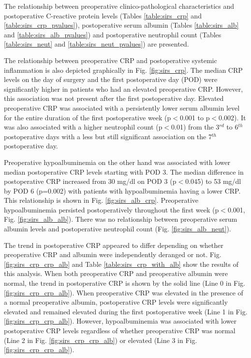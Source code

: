 The relationship between preoperative clinico-pathological characteristics and postoperative C-reactive protein levels (Tables \ref{table:sirs_crp} and \ref{table:sirs_crp_pvalues}), postoperative serum albumin (Tables \ref{table:sirs_alb} and \ref{table:sirs_alb_pvalues}) and postoperative neutrophil count (Tables \ref{table:sirs_neut} and \ref{table:sirs_neut_pvalues}) are presented.

The relationship between preoperative CRP and postoperative systemic inflammation is also depicted graphically in Fig. \ref{fig:sirs_crp}. 
The median CRP levels on the day of surgery and the first postoperative day (POD) were significantly higher in patients who had an elevated preoperative CRP. 
However, this association was not present after the first postoperative day.
Elevated preoperative CRP was associated with a persistently lower serum albumin level for the entire duration of the first postoperative week (p$<$0.001 to p$<$0.002).
It was also associated with a higher neutrophil count (p$<$0.01) from the 3$^{rd}$ to 6$^{th}$ postoperative days with a less but still significant association on the 7$^{th}$ postoperative day. 

Preoperative hypoalbuminemia on the other hand was associated with lower median postoperative CRP levels starting with POD 3. 
The median difference in postoperative CRP increased from 30 mg/dl on POD 3 (p$<$0.045) to 53 mg/dl by POD 6 (p=0.002) with patients with hypoalbuminemia having a lower CRP. 
This relationship is shown in Fig. \ref{fig:sirs_alb_crp}.
Preoperative hypoalbuminemia persisted postoperatively throughout the first week (p$<$0.001, Fig. \ref{fig:sirs_alb_alb}).
There was no relationship between preoperative serum albumin levels and postoperative neutrophil count (Fig. \ref{fig:sirs_alb_neut}).

The trend in postoperative CRP appeared to differ depending on whether preoperative CRP and albumin were independently deranged or not.
Fig. \ref{fig:sirs_crp_crp_alb} and Table \ref{table:sirs_crp_with_alb} show the results of this analysis.
When both preoperative CRP and preoperative albumin were normal, the trend in postoperative CRP is shown by the solid line (Line 0 in Fig. \ref{fig:sirs_crp_crp_alb}). 
When preoperative CRP was elevated in the presence of a normal preoperative albumin, postoperative CRP levels were significantly elevated and remained elevated during the first postoperative week (Line 1 in Fig. \ref{fig:sirs_crp_crp_alb}). 
However, hypoalbuminemia was associated with lower postoperative CRP levels regardless of whether preoperative CRP was normal (Line 2 in Fig. \ref{fig:sirs_crp_crp_alb}) or elevated (Line 3 in Fig. \ref{fig:sirs_crp_crp_alb}). 

